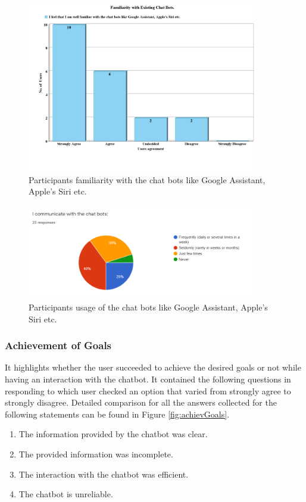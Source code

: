 \begin{figure}[!h]
    \centering
    \includegraphics[width=0.9\textwidth]{img/Familiraity_Updated_2.PNG}
    \caption{Participants familiarity with the chat bots like Google Assistant, Apple's Siri etc.}
    \label{fig:familiarity}
\end{figure}

\begin{figure}[!h]
    \centering
    \includegraphics[width=0.9\textwidth]{img/Communicate_Chatbots_Result.PNG}
    \caption{Participants usage of the chat bots like Google Assistant, Apple's Siri etc.}
    \label{fig:commChatRes}
\end{figure}

\subsubsection*{Achievement of Goals}
It highlights whether the user succeeded to achieve the desired goals or not while having an interaction with the chatbot. It contained the following questions in responding to which user checked an option that varied from strongly agree to strongly disagree. Detailed comparison for all the answers collected for the following statements can be found in Figure \ref{fig:achievGoals}.
\begin{enumerate}
    \item The information provided by the chatbot was clear.
    \item The provided information was incomplete.
    \item The interaction with the chatbot was efficient.
    \item The chatbot is unreliable.
\end{enumerate}

